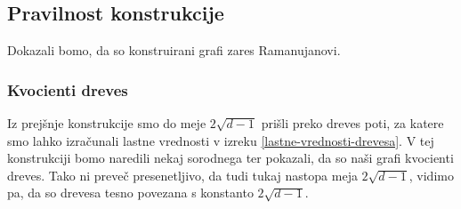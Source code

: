\subsection{Pravilnost konstrukcije}
Dokazali bomo, da so konstruirani grafi zares Ramanujanovi.

\subsubsection{Kvocienti dreves}
Iz prejšnje konstrukcije smo do meje \(2\sqrt{d-1}\) prišli preko dreves poti, za katere smo lahko izračunali lastne vrednosti v izreku \ref{lastne-vrednosti-drevesa}. V tej konstrukciji bomo naredili nekaj sorodnega ter pokazali, da so naši grafi kvocienti dreves. Tako ni preveč presenetljivo, da tudi tukaj nastopa meja \(2\sqrt{d-1}\), vidimo pa, da so drevesa tesno povezana s konstanto \(2\sqrt{d-1}\).


